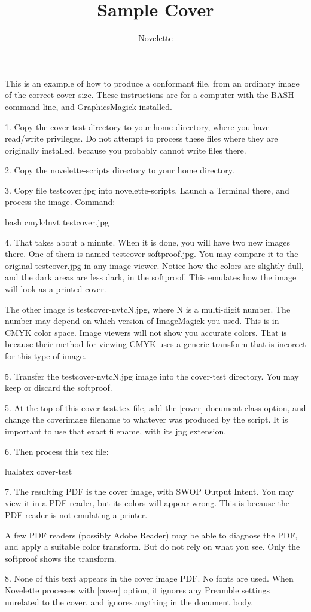 \documentclass{novelette} %
\title{Sample Cover} %
\author{Novelette}
\begin{document}
This is an example of how to produce a  conformant file,
from an ordinary image of the correct cover size. These instructions are
for a computer with the BASH command line, and GraphicsMagick installed.

1. Copy the cover-test directory to your home directory, where you
have read/write privileges. Do not attempt to process these files where
they are originally installed, because you probably cannot write files there.

2. Copy the novelette-scripts directory to your home directory.

3. Copy file testcover.jpg into novelette-scripts.
Launch a Terminal there, and process the image. Command:

bash cmyk4nvt testcover.jpg

4. That takes about a minute. When it is done, you will have two new images
there. One of them is named testcover-softproof.jpg. You may compare it
to the original testcover.jpg in any image viewer. Notice how the colors
are slightly dull, and the dark areas are less dark, in the softproof.
This emulates how the image will look as a printed cover.

The other image is testcover-nvtcN.jpg, where N is a multi-digit number.
The number may depend on which version of ImageMagick you used. This is
in CMYK color space. Image viewers will not show you accurate colors.
That is because their method for viewing CMYK uses a generic transform that
is incorect for this type of image.

5. Transfer the testcover-nvtcN.jpg image into the cover-test
directory. You may keep or discard the softproof.

5. At the top of this cover-test.tex file, add the [cover]
document class option, and change the coverimage filename to whatever was
produced by the script. It is important to use that exact filename, with its
jpg extension.

6. Then process this tex file:

lualatex cover-test

\null

7. The resulting PDF is the cover image,  with SWOP Output
Intent. You may view it in a PDF reader, but its colors will appear wrong.
This is because the PDF reader is not emulating a printer.

A few PDF readers (possibly Adobe Reader) may be able to diagnose the PDF,
and apply a suitable color transform.
But do not rely on what you see. Only the softproof shows the transform.

8. None of this text appears in the cover image PDF. No fonts are used.
When Novelette processes with [cover] option, it ignores any Preamble
settings unrelated to the cover, and ignores anything in the document body.

\makeatletter\nocle@rtoendtrue\makeatother
\end{document}

